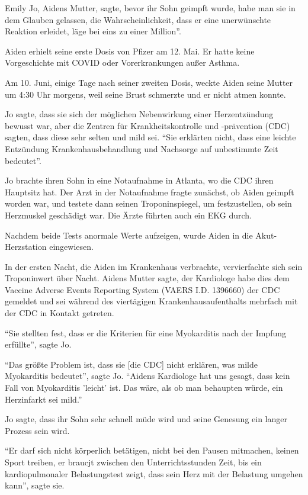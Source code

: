 Emily Jo, Aidens Mutter, sagte, bevor ihr Sohn geimpft wurde, habe man sie in
dem Glauben gelassen, die Wahrscheinlichkeit, dass er eine unerwünschte Reaktion
erleidet, läge bei eins zu einer Million''.

Aiden erhielt seine erste Dosis von Pfizer am 12. Mai. Er hatte keine
Vorgeschichte mit COVID oder Vorerkrankungen außer Asthma.

Am 10. Juni, einige Tage nach seiner zweiten Dosis, weckte Aiden seine Mutter um
4:30 Uhr morgens, weil seine Brust schmerzte und er nicht atmen konnte.

Jo sagte, dass sie sich der möglichen Nebenwirkung einer Herzentzündung bewusst
war, aber die Zentren für Krankheitskontrolle und -prävention (CDC) sagten, dass
diese sehr selten und mild sei. ``Sie erklärten nicht, dass eine leichte
Entzündung Krankenhausbehandlung und Nachsorge auf unbestimmte Zeit bedeutet''.

Jo brachte ihren Sohn in eine Notaufnahme in Atlanta, wo die CDC ihren Hauptsitz
hat. Der Arzt in der Notaufnahme fragte zunächst, ob Aiden geimpft worden war,
und testete dann seinen Troponinspiegel, um festzustellen, ob sein Herzmuskel
geschädigt war. Die Ärzte führten auch ein EKG durch.

Nachdem beide Tests anormale Werte aufzeigen, wurde Aiden in die
Akut-Herzstation eingewiesen.

In der ersten Nacht, die Aiden im Krankenhaus verbrachte, vervierfachte sich
sein Troponinwert über Nacht. Aidens Mutter sagte, der Kardiologe habe dies dem
Vaccine Adverse Events Reporting System (VAERS I.D. 1396660) der CDC gemeldet
und sei während des viertägigen Krankenhausaufenthalts mehrfach mit der CDC in
Kontakt getreten.

``Sie stellten fest, dass er die Kriterien für eine Myokarditis nach der Impfung
erfüllte'', sagte Jo.

``Das größte Problem ist, dass sie [die CDC] nicht erklären, was milde
Myokarditis bedeutet'', sagte Jo. ``Aidens Kardiologe hat uns gesagt, dass kein
Fall von Myokarditis 'leicht' ist. Das wäre, als ob man behaupten würde, ein
Herzinfarkt sei mild.''

Jo sagte, dass ihr Sohn sehr schnell müde wird und seine Genesung ein langer
Prozess sein wird.

``Er darf sich nicht körperlich betätigen, nicht bei den Pausen mitmachen,
keinen Sport treiben, er braucjt zwischen den Unterrichtsstunden Zeit, bis ein
kardiopulmonaler Belastungstest zeigt, dass sein Herz mit der Belastung umgehen
kann'', sagte sie.

